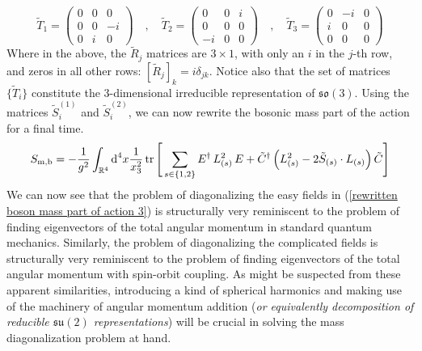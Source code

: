 %
%
\begin{equation}
\tilde{T}_1 = \left( \begin{array}{ccc}
0 & 0 & 0 \\
0 & 0 & -i \\
0 & i & 0
\end{array} \right)
%
\quad , \quad
%
\tilde{T}_2 = \left( \begin{array}{ccc}
0 & 0 & i \\
0 & 0 & 0 \\
-i & 0 & 0
\end{array} \right)
%
\quad , \quad
%
\tilde{T}_3 = \left( \begin{array}{ccc}
0 & -i & 0 \\
i & 0 & 0 \\
0 & 0 & 0
\end{array} \right)
\end{equation}
%
%
Where in the above, the $\tilde{R}_j$ matrices are $3 \times 1$, with only an $i$ in the $j$-th row, and zeros in all other rows: $[\tilde{R}_j]_k = i \delta_{jk}$. Notice also that the set of matrices $\{ \tilde{T}_i \}$ constitute the 3-dimensional irreducible representation of $\mathfrak{so}(3)$. Using the matrices $\tilde{S}^{(1)}_i$ and $\tilde{S}^{(2)}_i$, we can now rewrite the bosonic mass part of the action for a final time.
%
%
\begin{equation}\label{rewritten boson mass part of action 3}
S_{\text{m,b}}
=
-\frac{1}{g^2} \int_{\mathbb{R}^4} \text{d}^4 x \frac{1}{x_3^2}
\tr \Bigg[
\sum_{s \in \{ 1, 2 \}}
E^\dagger \, L_{(s)}^2 \, E
+
\tilde{C}^\dagger
\left(
L_{(s)}^2 - 2 \tilde{S}_{(s)} \cdot L_{(s)}
\right)
\tilde{C}
\Bigg]
\end{equation}
%
%
We can now see that the problem of diagonalizing the easy fields in (\ref{rewritten boson mass part of action 3}) is structurally very reminiscent to the problem of finding eigenvectors of the total angular momentum in standard quantum mechanics. Similarly, the problem of diagonalizing the complicated fields is structurally very reminiscent to the problem of finding eigenvectors of the total angular momentum with spin-orbit coupling. As might be suspected from these apparent similarities, introducing a kind of spherical harmonics and making use of the machinery of angular momentum addition (\textit{or equivalently decomposition of reducible $\mathfrak{su}(2)$ representations}) will be crucial in solving the mass diagonalization problem at hand.\\
\\
